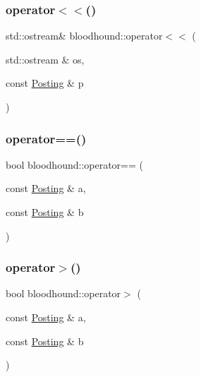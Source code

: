 \mbox{\label{namespacebloodhound_a1422cc04658f6eb8616381224186059f}} 
\subsubsection{\texorpdfstring{operator$<$$<$()}{operator<<()}}
{\footnotesize\ttfamily std\+::ostream\& bloodhound\+::operator$<$$<$ (\begin{DoxyParamCaption}\item[{std\+::ostream \&}]{os,  }\item[{const \mbox{\hyperlink{structbloodhound_1_1Posting}{Posting}} \&}]{p }\end{DoxyParamCaption})}

\mbox{\label{namespacebloodhound_aa37ad87847e4da8983f626e6c5779c73}} 
\subsubsection{\texorpdfstring{operator==()}{operator==()}}
{\footnotesize\ttfamily bool bloodhound\+::operator== (\begin{DoxyParamCaption}\item[{const \mbox{\hyperlink{structbloodhound_1_1Posting}{Posting}} \&}]{a,  }\item[{const \mbox{\hyperlink{structbloodhound_1_1Posting}{Posting}} \&}]{b }\end{DoxyParamCaption})}

\mbox{\label{namespacebloodhound_a4a683ebe3ff767a829b87a89bade978c}} 
\subsubsection{\texorpdfstring{operator$>$()}{operator>()}}
{\footnotesize\ttfamily bool bloodhound\+::operator$>$ (\begin{DoxyParamCaption}\item[{const \mbox{\hyperlink{structbloodhound_1_1Posting}{Posting}} \&}]{a,  }\item[{const \mbox{\hyperlink{structbloodhound_1_1Posting}{Posting}} \&}]{b }\end{DoxyParamCaption})}

